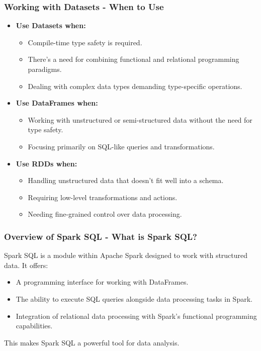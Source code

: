 \documentclass{beamer}
\begin{document}
\begin{frame}[fragile]
    \frametitle{Working with Datasets - When to Use}
    \begin{itemize}
        \item \textbf{Use Datasets when:}
        \begin{itemize}
            \item Compile-time type safety is required.
            \item There's a need for combining functional and relational programming paradigms.
            \item Dealing with complex data types demanding type-specific operations.
        \end{itemize}
        
        \item \textbf{Use DataFrames when:}
        \begin{itemize}
            \item Working with unstructured or semi-structured data without the need for type safety.
            \item Focusing primarily on SQL-like queries and transformations.
        \end{itemize}
        
        \item \textbf{Use RDDs when:}
        \begin{itemize}
            \item Handling unstructured data that doesn't fit well into a schema.
            \item Requiring low-level transformations and actions.
            \item Needing fine-grained control over data processing.
        \end{itemize}
    \end{itemize}
\end{frame}

\begin{frame}[fragile]
    \frametitle{Overview of Spark SQL - What is Spark SQL?}
    Spark SQL is a module within Apache Spark designed to work with structured data. It offers:
    \begin{itemize}
        \item A programming interface for working with DataFrames.
        \item The ability to execute SQL queries alongside data processing tasks in Spark.
        \item Integration of relational data processing with Spark's functional programming capabilities.
    \end{itemize}
    This makes Spark SQL a powerful tool for data analysis.
\end{frame}
\end{document}
